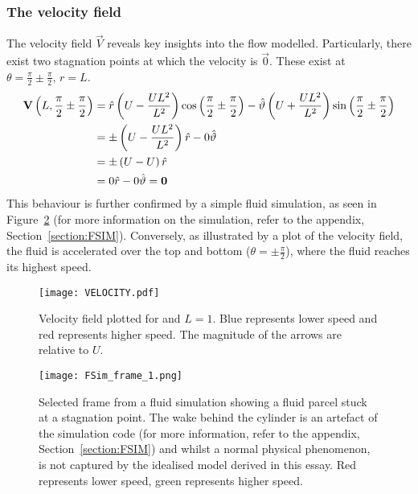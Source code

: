\subsubsection{The velocity field}
The velocity field $\vec{V}$ reveals key insights into the flow modelled. Particularly, there exist two
stagnation points at which the velocity is $\vec{0}$. These exist at $\theta=\frac{\pi}{2}\pm\frac{\pi}{2},\,r=L$.
\begin{align*}
	\mathbf{V}\left(L, \frac{\pi}{2}\pm\frac{\pi}{2}\right)&=\hat{r}\left(U-\frac{UL^2}{L^{2}}\right)\cos\left(\frac{\pi}{2}\pm\frac{\pi}{2}\right)-\hat{\vartheta}\left(U+\frac{UL^2}{L^{2}}\right)\sin\left(\frac{\pi}{2}\pm\frac{\pi}{2}\right)\\
	&=\pm\left(U-\frac{UL^2}{L^{2}}\right)\hat{r}-0\hat{\vartheta}\\
	&=\pm\left(U-U\right)\hat{r}\\
	&=0\hat{r}-0\hat{\vartheta}=\mathbf{0}
\end{align*}
This behaviour is further confirmed by a simple fluid simulation, as seen in Figure~\ref{figure:FSIM} (for more information on the simulation, refer to the appendix, Section~\ref{section:FSIM}).
Conversely, as illustrated by a plot of the velocity field, the fluid is accelerated over the top and bottom ($\theta=\pm\frac{\pi}{2}$), where the fluid reaches
its highest speed.
\begin{figure}
	\centering
	\texttt{[image: VELOCITY.pdf]}
	\caption{Velocity field plotted for and $L=1$. Blue represents lower speed and red represents higher speed. The magnitude of the arrows are relative to $U$.}
	\label{figure:VELOCITY_FIELD}
\end{figure}
\begin{figure}
	\centering
	\texttt{[image: FSim\_frame\_1.png]}
	\caption{Selected frame from a fluid simulation showing a fluid parcel stuck at a stagnation point. The wake behind the cylinder is an artefact of the simulation code (for more information, refer to the appendix, Section~\ref{section:FSIM}) and whilst a normal physical phenomenon, is not captured by the idealised model derived in this essay. Red represents lower speed, green represents higher speed.}
	\label{figure:FSIM}
\end{figure}


